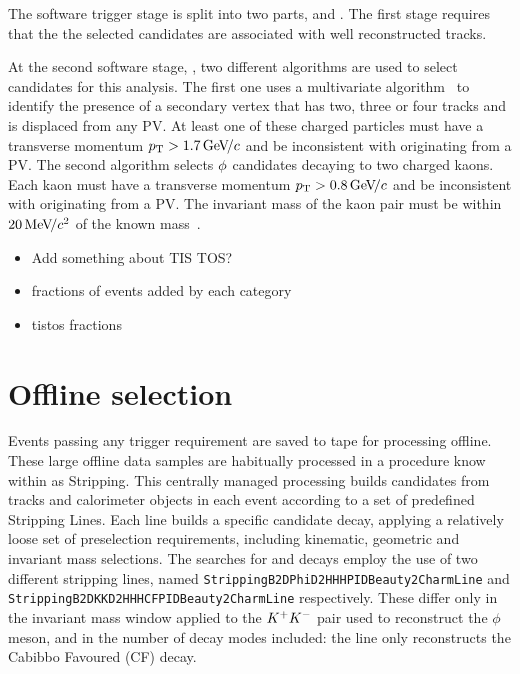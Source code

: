 The software trigger stage is split into two parts, \hltone and \hlttwo.
The first stage \hltone requires that the the selected candidates are associated with well reconstructed tracks.

At the second software stage, \hlttwo, two different algorithms are used to select candidates for this analysis.
The first one uses a multivariate algorithm~\cite{BBDT} to identify the presence of a secondary vertex that has two, three or four tracks and is displaced from any PV. At least one of these charged particles must have a transverse momentum $\mbox{$p_{\mathrm{ T}}$} > 1.7{\mathrm{\,Ge\kern -0.1em V\!/}c}$ and be inconsistent with originating from a PV. 
The second algorithm selects $\phi$ candidates decaying to two charged kaons. Each kaon must have a transverse momentum $\mbox{$p_{\mathrm{ T}}$} > 0.8{\mathrm{\,Ge\kern -0.1em V\!/}c}$ and be inconsistent with originating from a PV. The invariant mass of the kaon pair must be within $20{\mathrm{\,Me\kern -0.1em V\!/}c^2}$ of the known \phiz mass~\cite{PDG2016}.

\begin{itemize}
\item Add something about TIS TOS?
\item fractions of events added by each category
\item \ie tistos fractions 
\end{itemize}


\section{Offline selection}

Events passing any trigger requirement are saved to tape for processing offline. These large offline data samples are habitually processed in a procedure know within \lhcb as Stripping. This centrally managed processing builds candidates from tracks and calorimeter objects in each event according to a set of predefined Stripping Lines. Each line builds a specific candidate decay, applying a relatively loose set of preselection requirements, including kinematic, geometric and invariant mass selections. 
The searches for \decay{\Bp}{\Dsp\phiz} and \decay{\Bp}{\Dsp\Kp\Km} decays employ the use of two different stripping lines, named \texttt{StrippingB2DPhiD2HHHPIDBeauty2CharmLine} and \texttt{StrippingB2DKKD2HHHCFPIDBeauty2CharmLine} respectively. These differ only in the invariant mass window applied to the ${{K}^+}{{K}^-}$ pair used to reconstruct the $\phi$ meson, and in the number of \Dsp decay modes included: the \decay{\Bp}{\Dsp\Kp\Km} line only reconstructs the Cabibbo Favoured (CF) \decay{\Dsp}{\Kp\Km\pip} decay. 

